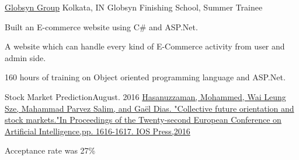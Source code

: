 \documentclass[10pt]{article}
\begin{document}
\headedsection
{\href{https://www.globsyn.com/}{Globsyn Group}}
{Kolkata, IN}
{Globsyn Finishing School, Summer Trainee}
{}
{\vspace{-2.4ex}
    \begin{circlist}	
	    \item Built an E-commerce website using C\# and ASP.Net.
	    \item A website which can handle every kind of E-Commerce activity from user and admin side.
	    \item 160 hours of training on Object oriented programming language and ASP.Net.
    \end{circlist}
}

\spacedhrule{0.8ex}{0.0ex}

\headedsectionthree
{Stock Market Prediction}{{August. }{2016}}
{\href{https://dl.acm.org/citation.cfm?id=3305804/}{Hasanuzzaman, Mohammed, Wai Leung Sze, Mahammad Parvez Salim, and Gaël Dias. "Collective future orientation and stock markets."\newline In Proceedings of the Twenty-second European Conference on Artificial Intelligence,\newline pp. 1616-1617. IOS Press,2016}}
{\vspace{-2.4ex}
    \begin{circlist}
        \item Acceptance rate was 27\%
    \end{circlist}
}

\spacedhrule{0.8ex}{0.0ex}
\end{document}
